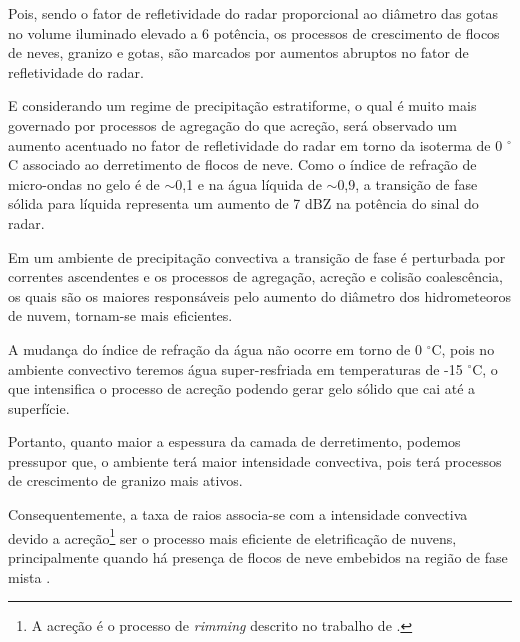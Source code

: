 Pois, sendo o fator de refletividade do radar proporcional ao diâmetro das gotas no volume iluminado elevado a 6 potência, os processos de crescimento de flocos de neves, granizo e gotas, são marcados por aumentos abruptos no fator de refletividade do radar. 

E considerando um regime de precipitação estratiforme, o qual é muito mais governado por processos de agregação do que acreção, será observado um aumento acentuado no fator de refletividade do radar em torno da isoterma de 0 $^{\circ}$C associado ao derretimento de flocos de neve.  Como o índice de refração de micro-ondas no gelo é de $\sim$0,1 e na água líquida de $\sim$0,9, a transição de fase sólida para líquida representa um aumento de 7 dBZ na potência do sinal do radar.



Em um ambiente de precipitação convectiva a transição de fase é perturbada por correntes ascendentes e os processos de agregação, acreção e colisão coalescência, os quais são os maiores responsáveis pelo aumento do diâmetro dos hidrometeoros de nuvem, tornam-se mais eficientes. 

A mudança do índice de refração da água não ocorre em torno de 0 $^{\circ}$C, pois no ambiente convectivo teremos água super-resfriada em temperaturas de -15 $^{\circ}$C, o que intensifica o processo de acreção podendo gerar gelo sólido que cai até a superfície.

Portanto, quanto maior a espessura da camada de derretimento, podemos pressupor que, o ambiente terá maior intensidade convectiva, pois terá processos de crescimento de granizo mais ativos.

Consequentemente, a taxa de raios associa-se com a intensidade convectiva devido a acreção\footnote{A acreção é o processo de \textit{rimming} descrito no trabalho de .} ser o processo mais eficiente de eletrificação de nuvens, principalmente quando há presença de flocos de neve embebidos na região de fase mista \cite{Takahashi1978,Takahashi2002}. 

